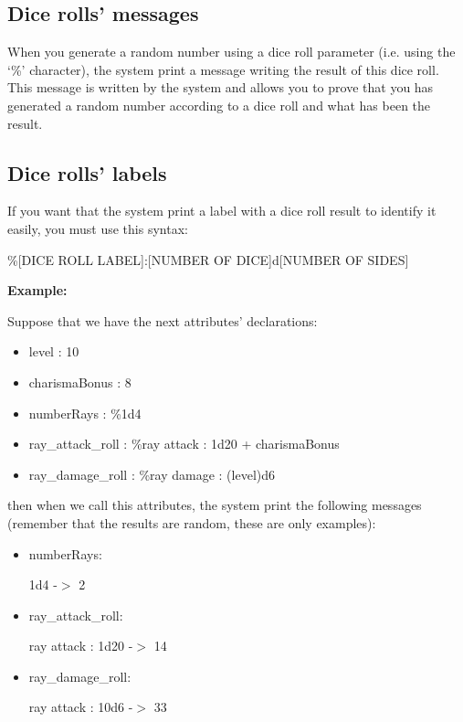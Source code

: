 \documentclass[11pt,a4paper,openright,oneside]{book}
\newenvironment{ex}
{
  \setlength{\parindent}{0cm}
  \large \textbf{Example:} \normalsize 
}
{}
\begin{document}
\subsection{Dice rolls' messages}

When you generate a random number using a dice roll parameter (i.e. using the `\textsf{\%}' character), the system print a message writing the result of this dice roll. This message is written by the system and allows you to prove that you has generated a random number according to a dice roll and what has been the result.

\subsection{Dice rolls' labels}

If you want that the system print a label with a dice roll result to identify it easily, you must use this syntax:

\begin{center} \textsf{\%\textsc{\scriptsize[DICE ROLL LABEL]}:\textsc{\scriptsize[NUMBER OF DICE]}d\textsc{\scriptsize[NUMBER OF SIDES]}} \end{center}

\begin{ex}
Suppose that we have the next attributes' declarations:
\begin{itemize}
  \item \textsf{level : 10}
  \item \textsf{charismaBonus : 8 }
  \item \textsf{numberRays : \%1d4} 
  \item \textsf{ray\_attack\_roll : \%ray attack : 1d20 + charismaBonus}
  \item \textsf{ray\_damage\_roll : \%ray damage : (level)d6}
\end{itemize}
then when we call this attributes, the system print the following messages (remember that the results are random, these are only examples):
\begin{itemize}
  \item numberRays:

  \textsf{1d4 -$>$ 2}

  \item ray\_attack\_roll:

  \textsf{ray attack : 1d20 -$>$ 14}

  \item ray\_damage\_roll:

  \textsf{ray attack : 10d6 -$>$ 33}
\end{itemize}
\end{ex}
\end{document}
